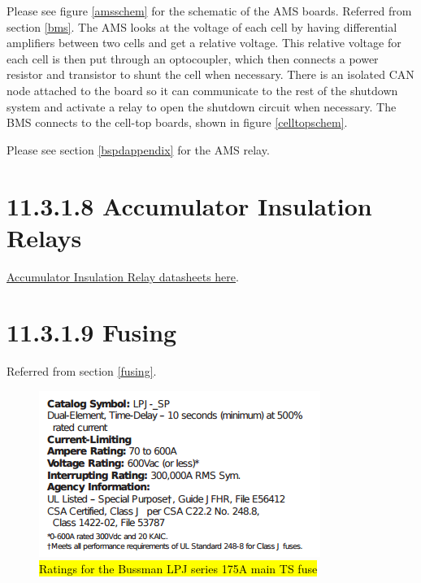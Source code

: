 \documentclass{article}
\DeclareRobustCommand{\hlr}[1]{{\sethlcolor{red}\hl{#1}}}
\begin{document}
Please see figure \ref{amsschem} for the schematic of the AMS boards. Referred from section \ref{bms}. The AMS looks at the voltage of each cell by having differential amplifiers between two cells and get a relative voltage. This relative voltage for each cell is then put through an optocoupler, which then connects a power resistor and transistor to shunt the cell when necessary. There is an isolated CAN node attached to the board so it can communicate to the rest of the shutdown system and activate a relay to open the shutdown circuit when necessary. The BMS connects to the cell-top boards, shown in figure \ref{celltopschem}.

Please see section \ref{bspdappendix} for the AMS relay.

\section*{11.3.1.8 Accumulator Insulation Relays}

\href{http://www.rec-bms.com/datasheet/Technical_datasheet_Kilovac.pdf}{Accumulator Insulation Relay datasheets here}.

\section*{11.3.1.9 Fusing} \label{fusingappendix}

Referred from section \ref{fusing}.

\begin{figure}[H]
    \centering
    \includegraphics{TSmainratings}
    \caption{\hlr{Ratings for the Bussman LPJ series 175A main TS fuse}}
    \label{mainTSfuseratings}
\end{figure}
\end{document}
